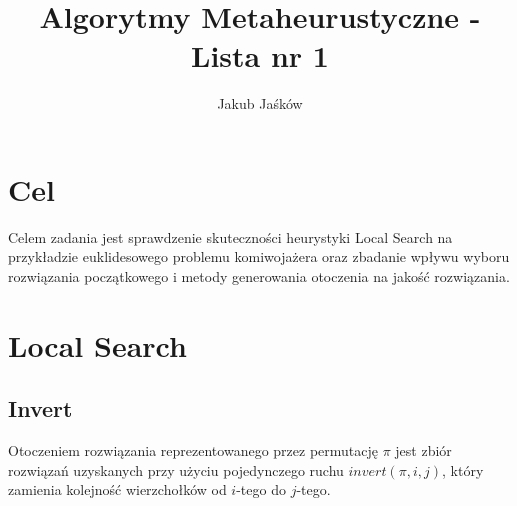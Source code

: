 \documentclass{article}
\author{Jakub Jaśków}
\title{Algorytmy Metaheurustyczne - Lista nr 1}
\begin{document}
\maketitle
\section*{Cel}
Celem zadania jest sprawdzenie skuteczności heurystyki Local Search na przykładzie euklidesowego problemu komiwojażera oraz
zbadanie wpływu wyboru rozwiązania początkowego i metody generowania otoczenia na jakość rozwiązania.

\section*{Local Search}
\subsection*{Invert}
Otoczeniem rozwiązania reprezentowanego przez permutację $\pi$ jest zbiór rozwiązań uzyskanych przy użyciu pojedynczego 
ruchu $invert(\pi, i, j)$, który zamienia kolejność wierzchołków od $i$-tego do $j$-tego.
\end{document}
